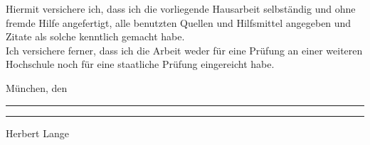Hiermit versichere ich, dass ich die vorliegende Hausarbeit selbständig und ohne fremde Hilfe angefertigt, alle benutzten Quellen und Hilfsmittel angegeben und Zitate als solche kenntlich gemacht habe. \\
Ich versichere ferner, dass ich die Arbeit weder für eine Prüfung an einer weiteren Hochschule noch für eine staatliche Prüfung eingereicht habe. \par
\vspace{3cm}
München, den \rule{7cm}{0.4pt} \par
\vspace{3cm}
\rule{10cm}{0.4pt} \par
Herbert Lange